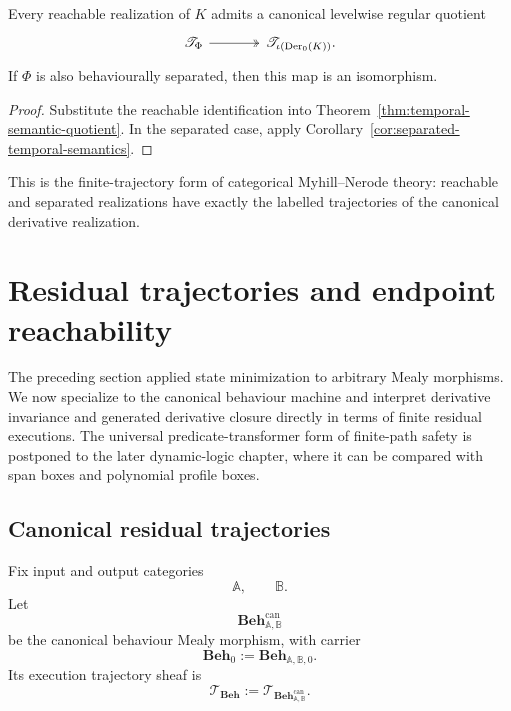 \begin{corollary}
\label{cor:temporal-reachable-quotient}
Every reachable realization of \(K\) admits a canonical levelwise regular
quotient
\[
\begin{tikzcd}[column sep=large]
    \mathscr T_\Phi
        \arrow[r, two heads]
    &
    \mathscr T_{\iota(\operatorname{Der}_0(K))}.
\end{tikzcd}
\]
If \(\Phi\) is also behaviourally separated, then this map is an
isomorphism.
\end{corollary}

\begin{proof}
Substitute the reachable identification into
Theorem~\ref{thm:temporal-semantic-quotient}. In the separated case, apply
Corollary~\ref{cor:separated-temporal-semantics}.
\end{proof}

This is the finite-trajectory form of categorical Myhill--Nerode theory:
reachable and separated realizations have exactly the labelled trajectories of
the canonical derivative realization.

\section{Residual trajectories and endpoint reachability}
\label{sec:residual-contracts-temporal-safety}

The preceding section applied state minimization to arbitrary Mealy
morphisms.  We now specialize to the canonical behaviour machine and
interpret derivative invariance and generated derivative closure directly in
terms of finite residual executions.  The universal predicate-transformer
form of finite-path safety is postponed to the later dynamic-logic chapter,
where it can be compared with span boxes and polynomial profile boxes.

\subsection{Canonical residual trajectories}
\label{subsec:canonical-residual-trajectories}

Fix input and output categories
\[
    \mathbb A,
    \qquad
    \mathbb B.
\]
Let
\[
    \mathbf{Beh}^{\mathrm{can}}_{\mathbb A,\mathbb B}
\]
be the canonical behaviour Mealy morphism, with carrier
\[
    \mathbf{Beh}_0
    :=
    \mathbf{Beh}_{\mathbb A,\mathbb B,0}.
\]
Its execution trajectory sheaf is
\[
    \mathscr T_{\mathbf{Beh}}
    :=
    \mathscr T_{\mathbf{Beh}^{\mathrm{can}}_{\mathbb A,\mathbb B}}.
\]

